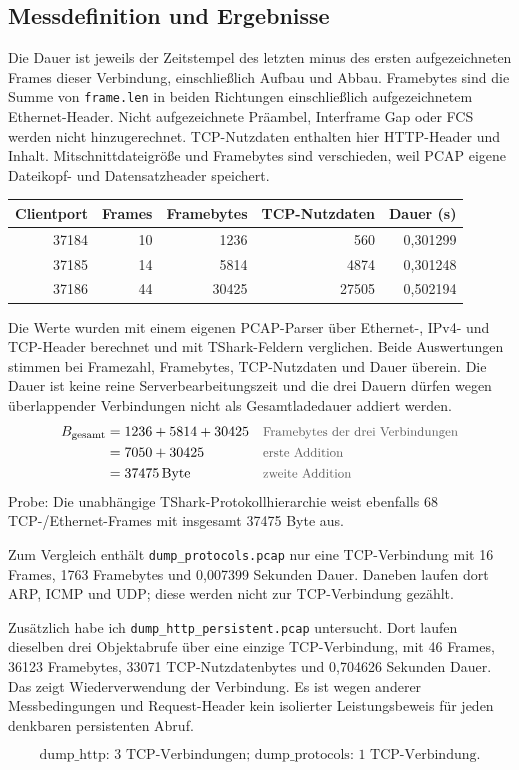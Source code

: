 \documentclass[a4paper,11pt]{article}
\newif\ifexplain
\newcommand{\why}[1]{\text{\small\color{black!65}#1}}
\newcommand{\explain}[1]{\ifexplain\begin{erklbox}#1\end{erklbox}\fi}
\begin{document}
\subsection*{Messdefinition und Ergebnisse}
Die Dauer ist jeweils der Zeitstempel des letzten minus des ersten aufgezeichneten Frames dieser Verbindung, einschließlich Aufbau und Abbau. Framebytes sind die Summe von \texttt{frame.len} in beiden Richtungen einschließlich aufgezeichnetem Ethernet-Header. Nicht aufgezeichnete Präambel, Interframe Gap oder FCS werden nicht hinzugerechnet. TCP-Nutzdaten enthalten hier HTTP-Header und Inhalt. Mitschnittdateigröße und Framebytes sind verschieden, weil PCAP eigene Dateikopf- und Datensatzheader speichert.

\begin{center}\small
\begin{tabular}{rrrrr}
\toprule
Clientport & Frames & Framebytes & TCP-Nutzdaten & Dauer (s)\\
\midrule
37184 & 10 & 1236 & 560 & 0,301299\\
37185 & 14 & 5814 & 4874 & 0,301248\\
37186 & 44 & 30425 & 27505 & 0,502194\\
\bottomrule
\end{tabular}
\end{center}
Die Werte wurden mit einem eigenen PCAP-Parser über Ethernet-, IPv4- und TCP-Header berechnet und mit TShark-Feldern verglichen. Beide Auswertungen stimmen bei Framezahl, Framebytes, TCP-Nutzdaten und Dauer überein. Die Dauer ist keine reine Serverbearbeitungszeit und die drei Dauern dürfen wegen überlappender Verbindungen nicht als Gesamtladedauer addiert werden.
\begin{align*}
B_{\mathrm{gesamt}}&=1236+5814+30425 &&\why{Framebytes der drei Verbindungen}\\
&=7050+30425 &&\why{erste Addition}\\
&=37475\,\mathrm{Byte} &&\why{zweite Addition}
\end{align*}
Probe: Die unabhängige TShark-Protokollhierarchie weist ebenfalls 68 TCP-/Ethernet-Frames mit insgesamt 37475 Byte aus.

Zum Vergleich enthält \texttt{dump\_protocols.pcap} nur eine TCP-Verbindung mit 16 Frames, 1763 Framebytes und 0,007399 Sekunden Dauer. Daneben laufen dort ARP, ICMP und UDP; diese werden nicht zur TCP-Verbindung gezählt.

Zusätzlich habe ich \texttt{dump\_http\_persistent.pcap} untersucht. Dort laufen dieselben drei Objektabrufe über eine einzige TCP-Verbindung, mit 46 Frames, 36123 Framebytes, 33071 TCP-Nutzdatenbytes und 0,704626 Sekunden Dauer. Das zeigt Wiederverwendung der Verbindung. Es ist wegen anderer Messbedingungen und Request-Header kein isolierter Leistungsbeweis für jeden denkbaren persistenten Abruf.
\explain{Zum Gruppieren reicht ein Port allein nicht allgemein aus. Die Prüfung verwendet beide Endpunkte samt Ports; bei wiederverwendeten Verbindungen müsste zusätzlich der TCP-Lebenszyklus unterschieden werden. In diesen Dateien gibt es pro Endpunktepaar genau einen vollständigen Aufbau und Abbau. Die tabellierten Clientports dienen nur als kurze Bezeichnungen.}
\[\boxed{\text{dump\_http: 3 TCP-Verbindungen; dump\_protocols: 1 TCP-Verbindung.}}\]
\end{document}
